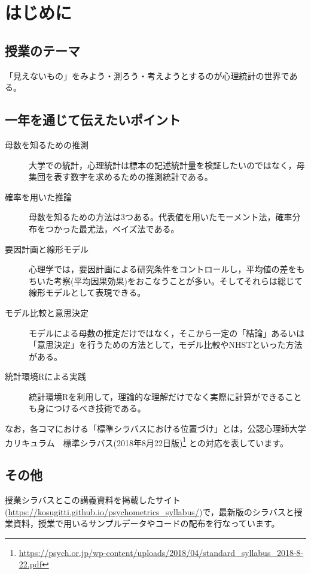 \section*{はじめに}
\subsection*{授業のテーマ}

「見えないもの」をみよう・測ろう・考えようとするのが心理統計の世界である。

\subsection*{一年を通じて伝えたいポイント}
\begin{description}
	\item[母数を知るための推測] 大学での統計，心理統計は標本の記述統計量を検証したいのではなく，母集団を表す数字を求めるための推測統計である。
	\item[確率を用いた推論] 母数を知るための方法は3つある。代表値を用いたモーメント法，確率分布をつかった最尤法，ベイズ法である。
	\item[要因計画と線形モデル] 心理学では，要因計画による研究条件をコントロールし，平均値の差をもちいた考察(平均因果効果)をおこなうことが多い。そしてそれらは総じて線形モデルとして表現できる。
	\item[モデル比較と意思決定] モデルによる母数の推定だけではなく，そこから一定の「結論」あるいは「意思決定」を行うための方法として，モデル比較やNHSTといった方法がある。
	\item[統計環境Rによる実践] 統計環境Rを利用して，理論的な理解だけでなく実際に計算ができることも身につけるべき技術である。
\end{description}


なお，各コマにおける「標準シラバスにおける位置づけ」とは，公認心理師大学カリキュラム　標準シラバス(2018年8月22日版)\footnote{\url{https://psych.or.jp/wp-content/uploads/2018/04/standard_syllabus_2018-8-22.pdf}} との対応を表しています。

\subsection*{その他}
授業シラバスとこの講義資料を掲載したサイト(\url{https://kosugitti.github.io/psychometrics_syllabus/})で，最新版のシラバスと授業資料，授業で用いるサンプルデータやコードの配布を行なっています。
